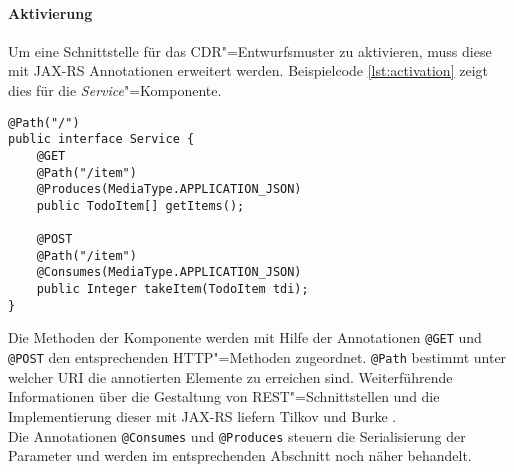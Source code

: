 \paragraph{Aktivierung}
Um eine Schnittstelle für das \ac{CDR}"=Entwurfsmuster zu aktivieren, muss diese mit \ac{JAX-RS} Annotationen erweitert werden. 
Beispielcode \ref{lst:activation} zeigt dies für die \textit{Service}"=Komponente.
\begin{lstlisting}[caption={Aktivierung},captionpos=b,label=lst:activation] 
@Path("/")
public interface Service {	
	@GET
	@Path("/item")
	@Produces(MediaType.APPLICATION_JSON)
	public TodoItem[] getItems();	

	@POST
	@Path("/item")
	@Consumes(MediaType.APPLICATION_JSON)
	public Integer takeItem(TodoItem tdi);	
}
\end{lstlisting}
Die Methoden der Komponente werden mit Hilfe der Annotationen \colorbox{mygray}{\lstinline!@GET!} und \colorbox{mygray}{\lstinline!@POST!} den entsprechenden \ac{HTTP}"=Methoden zugeordnet. \colorbox{mygray}{\lstinline!@Path!} bestimmt unter welcher \ac{URI} die annotierten Elemente zu erreichen sind. Weiterführende Informationen über die Gestaltung von \ac{REST}"=Schnittstellen und die Implementierung dieser mit \ac{JAX-RS} liefern Tilkov \cite{Tilkov2011} und Burke \cite{Burke2010}. \\
Die Annotationen \colorbox{mygray}{\lstinline!@Consumes!} und \colorbox{mygray}{\lstinline!@Produces!} steuern die Serialisierung der Parameter und werden im entsprechenden Abschnitt noch näher behandelt.
\newpage
